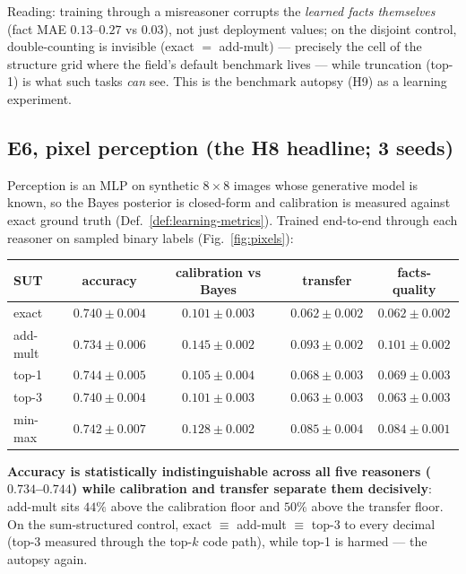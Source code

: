 \documentclass[10pt]{article}
\theoremstyle{remark}
\begin{document}
\noindent Reading: training through a misreasoner corrupts the \emph{learned facts themselves}
(fact MAE $0.13$--$0.27$ vs $0.03$), not just deployment values; on the disjoint control,
double-counting is invisible (exact $=$ add-mult) --- precisely the cell of the structure grid
where the field's default benchmark lives --- while truncation (top-1) is what such tasks
\emph{can} see. This is the benchmark autopsy (H9) as a learning experiment.

\subsection{E6, pixel perception (the H8 headline; 3 seeds)}

Perception is an MLP on synthetic $8{\times}8$ images whose generative model is known, so the
Bayes posterior is closed-form and calibration is measured against exact ground truth
(Def.~\ref{def:learning-metrics}). Trained end-to-end through each reasoner on sampled binary
labels (Fig.~\ref{fig:pixels}):

\begin{center}\small
\begin{tabular}{lcccc}
\toprule
SUT & accuracy & calibration vs Bayes & transfer & facts-quality\\
\midrule
exact & $0.740 \pm 0.004$ & $0.101 \pm 0.003$ & $0.062 \pm 0.002$ & $0.062 \pm 0.002$\\
add-mult & $0.734 \pm 0.006$ & $0.145 \pm 0.002$ & $0.093 \pm 0.002$ & $0.101 \pm 0.002$\\
top-1 & $0.744 \pm 0.005$ & $0.105 \pm 0.004$ & $0.068 \pm 0.003$ & $0.069 \pm 0.003$\\
top-3 & $0.740 \pm 0.004$ & $0.101 \pm 0.003$ & $0.063 \pm 0.003$ & $0.063 \pm 0.003$\\
min-max & $0.742 \pm 0.007$ & $0.128 \pm 0.002$ & $0.085 \pm 0.004$ & $0.084 \pm 0.001$\\
\bottomrule
\end{tabular}
\end{center}

\noindent \textbf{Accuracy is statistically indistinguishable across all five reasoners
($0.734$--$0.744$) while calibration and transfer separate them decisively}: add-mult sits $44\%$
above the calibration floor and $50\%$ above the transfer floor. On the sum-structured control,
exact $\equiv$ add-mult $\equiv$ top-3 to every decimal (top-3 measured through the top-$k$ code
path), while top-1 is harmed --- the autopsy again.
\end{document}

